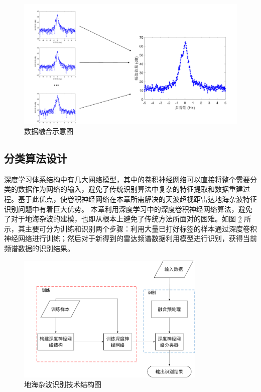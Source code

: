 \begin{figure}[H]
	\centering
	\includegraphics[width=13.5cm]{figures/othr/spectrum_fusion}
	\caption{数据融合示意图}
	\label{fig:spectrum_fusion}
\end{figure}

\subsection{分类算法设计}
深度学习体系结构中有几大网络模型，其中的卷积神经网络可以直接将整个需要分类的数据作为网络的输入，避免了传统识别算法中复杂的特征提取和数据重建过程。基于此优点，使卷积神经网络在本章所需解决的天波超视距雷达地海杂波特征识别问题中有着巨大优势。
本章利用深度学习中的深度卷积神经网络算法，避免了对于地海杂波的建模，也即从根本上避免了传统方法所面对的困难。如图 \ref{fig:othr_tech} 所示，其主要可分为训练和识别两个步骤：利用大量已打好标签的样本通过深度卷积神经网络进行训练；然后对于新得到的雷达频谱数据利用模型进行识别，获得当前频谱数据的识别结果。

\begin{figure}[hbt]
	\centering
	\includegraphics[width=9cm]{figures/othr/othr_tech}
	\caption{地海杂波识别技术结构图}
	\label{fig:othr_tech}
\end{figure}

